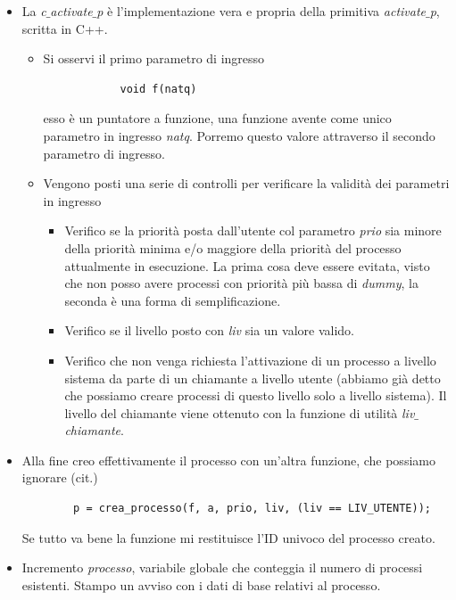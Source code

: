 \documentclass[11pt]{report}
\theoremstyle{definition}
\begin{document}
\begin{itemize}
	\item La \emph{c$\_$activate$\_$p} è l'implementazione vera e propria della primitiva \emph{activate$\_$p}, scritta in C++. 
	\begin{itemize}
		\item Si osservi il primo parametro di ingresso
		\begin{verbatim}
			void f(natq)
		\end{verbatim}
		esso è un puntatore a funzione, una funzione avente come unico parametro in ingresso \emph{natq}. Porremo questo valore attraverso il secondo parametro di ingresso.
		\item Vengono posti una serie di controlli per verificare la validità dei parametri in ingresso
		\begin{itemize}
			\item Verifico se la priorità posta dall'utente col parametro \emph{prio} sia minore della priorità minima e/o maggiore della priorità del processo attualmente in esecuzione. La prima cosa deve essere evitata, visto che non posso avere processi con priorità più bassa di \emph{dummy}, la seconda è una forma di semplificazione.
			\item Verifico se il livello posto con \emph{liv} sia un valore valido.
			\item Verifico che non venga richiesta l'attivazione di un processo a livello sistema da parte di un chiamante a livello utente (abbiamo già detto che possiamo creare processi di questo livello solo a livello sistema). Il livello del chiamante viene ottenuto con la funzione di utilità \emph{liv$\_$chiamante}.
		\end{itemize}
	\end{itemize}
	\item Alla fine creo effettivamente il processo con un'altra funzione, che possiamo ignorare (cit.)
	\begin{verbatim}
		p = crea_processo(f, a, prio, liv, (liv == LIV_UTENTE));
	\end{verbatim}
	Se tutto va bene la funzione mi restituisce l'ID univoco del processo creato.
	\item Incremento \emph{processo}, variabile globale che conteggia il numero di processi esistenti. Stampo un avviso con i dati di base relativi al processo.
\end{itemize}
\end{document}
